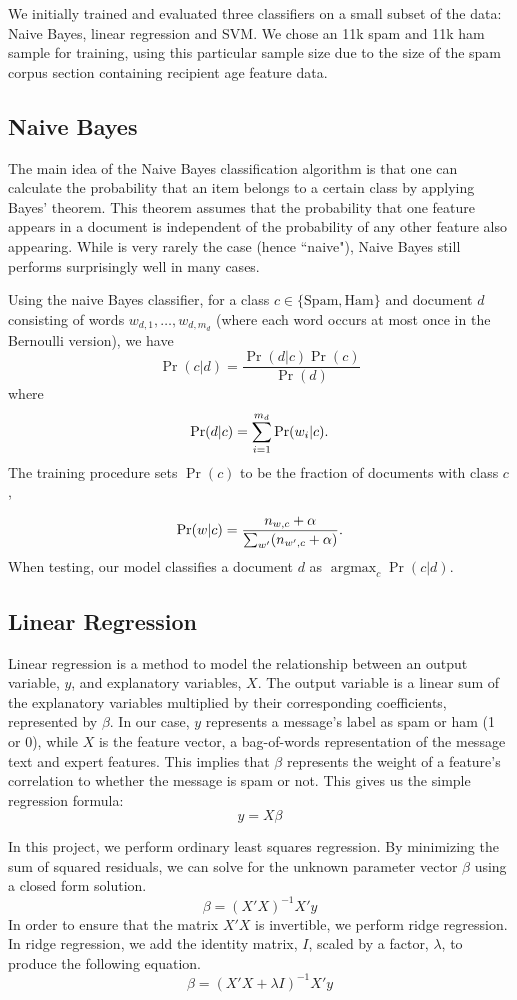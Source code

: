 \documentclass[preprint]{acm_proc_article-sp}
\DeclareMathOperator{\Argmax}{argmax}
\newcommand{\PosC}{\mathrm{Spam}}
\newcommand{\NegC}{\mathrm{Ham}}
\begin{document}
We initially trained and evaluated three classifiers on a small subset of the data: 
Naive Bayes, linear regression and SVM.  We chose an 11k spam and 11k ham sample for 
training, using this particular sample size due to the size of the spam corpus 
section containing recipient age feature data.  

\subsection{Naive Bayes}

The main idea of the Naive Bayes classification algorithm is that one can calculate the probability 
that an item belongs to a certain class by applying Bayes' theorem. This theorem assumes that the probability 
that one feature appears in a document is independent of the probability of any other feature also appearing.  
While is very rarely the case (hence ``naive"), Naive Bayes still performs surprisingly well in many cases.
 
Using the naive Bayes classifier, for a class \(c \in \{\PosC, \NegC\}\) and document \(d\) consisting of words \(w_{d,1},\dotsc,w_{d,m_d}\) (where each word occurs at most once in the Bernoulli version), we have
\[\Pr(c|d)=\frac{\Pr(d|c)\Pr(c)}{\Pr(d)}\]
where
\[\Pr(d|c)=\sum_{i=1}^{m_d}\Pr(w_i|c)\ldotp\]
The training procedure sets \(\Pr(c)\) to be the fraction of documents with class \(c\),%

\[\Pr(w|c)=\frac{n_{w,c}+\alpha}{\sum_{w'}(n_{w',c}+\alpha)}\ldotp\]
When testing, our model classifies a document \(d\) as \(\Argmax_c\Pr(c|d)\).

\subsection{Linear Regression}

Linear regression is a method to model the relationship between an output variable, 
$y$, and explanatory variables, $X$. The output variable is a linear sum of the explanatory 
variables multiplied by their corresponding coefficients, represented by $\beta$. 
In our case, $y$ represents a message's label as spam or ham (1 or 0), 
while $X$ is the feature vector, a bag-of-words representation of the message text and expert features. 
This implies that $\beta$ represents the weight of a feature's correlation to whether 
the message is spam or not. This gives us the simple regression formula: $$y=X\beta$$

In this project, we perform ordinary least squares regression. By minimizing the sum of squared 
residuals, we can solve for the unknown parameter vector $\beta$ using a closed form solution. 
$$\beta=(X'X)^{-1}X'y$$ In order to ensure that the matrix $X'X$ is invertible, we perform ridge regression. 
In ridge regression, we add the identity matrix, $I$, scaled by a factor, $\lambda$, to 
produce the following equation. $$\beta=(X'X+\lambda I)^{-1}X'y$$
\end{document}

